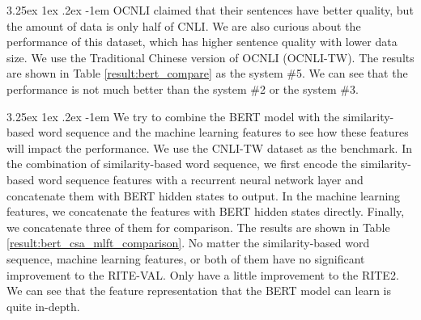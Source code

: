 \documentclass[12pt]{article}
\makeatletter
\renewcommand\paragraph{\@startsection{paragraph}{5}{\z@}%
  {3.25ex \@plus1ex \@minus.2ex}%
  {-1em}%
  {\normalfont\normalsize\bfseries}}
\makeatother
\begin{document}
\begin{CJK*}{UTF8}{bkai}
\begin{spacing}{1.77}
\paragraph{}
OCNLI claimed that their sentences have better quality, but the amount of data is only half of CNLI. We are also curious about the performance of this dataset, which has higher sentence quality with lower data size. We use the Traditional Chinese version of OCNLI (OCNLI-TW). The results are shown in Table \ref{result:bert_compare} as the system \#5. We can see that the performance is not much better than the system \#2 or the system \#3.

\paragraph{}
We try to combine the BERT model with the similarity-based word sequence and the machine learning features to see how these features will impact the performance. We use the CNLI-TW dataset as the benchmark. In the combination of similarity-based word sequence, we first encode the similarity-based word sequence features with a recurrent neural network layer and concatenate them with BERT hidden states to output. In the machine learning features, we concatenate the features with BERT hidden states directly. Finally, we concatenate three of them for comparison. The results are shown in Table \ref{result:bert_csa_mlft_comparison}. No matter the similarity-based word sequence, machine learning features, or both of them have no significant improvement to the RITE-VAL. Only have a little improvement to the RITE2. We can see that the feature representation that the BERT model can learn is quite in-depth.


\end{spacing}
\end{CJK*}
\end{document}
